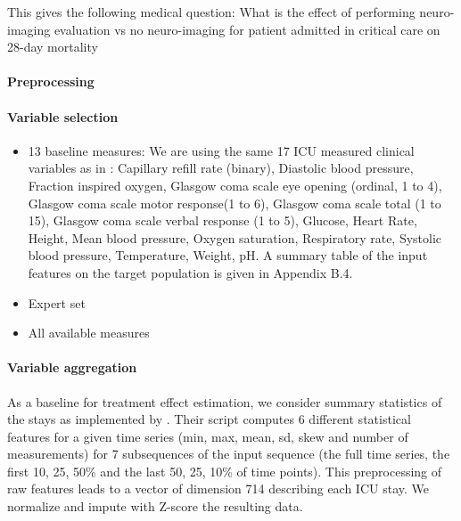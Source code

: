This gives the following medical question: What is the effect of
\textcolor{I}{performing neuro-imaging evaluation} vs \textcolor{C}{no
  neuro-imaging} for patient admitted in critical care on \textcolor{O}{28-day mortality}

\paragraph{Preprocessing}

\paragraph{Variable selection}

\begin{itemize}
  \item 13 baseline measures: We are using the same 17 ICU measured clinical variables as in
        \citep{harutyunyan2019multitask}: Capillary refill rate (binary), Diastolic blood
        pressure, Fraction inspired oxygen, Glasgow coma scale eye opening (ordinal, 1
        to 4), Glasgow coma scale motor response(1 to 6), Glasgow coma scale total (1 to
        15), Glasgow coma scale verbal response (1 to 5), Glucose, Heart Rate, Height,
        Mean blood pressure, Oxygen saturation, Respiratory rate, Systolic blood
        pressure, Temperature, Weight, pH. A summary table of the input features on the
        target population is given in Appendix B.4.
  \item Expert set
  \item All available measures 
\end{itemize}

\paragraph{Variable aggregation}

As a baseline for treatment effect estimation, we consider summary statistics of
the stays as implemented by \citep{harutyunyan2019multitask}. Their script computes 6
different statistical features for a given time series (min, max, mean, sd, skew
and number of measurements) for 7 subsequences of the input sequence (the full
time series, the first 10, 25, 50\% and the last 50, 25, 10\% of time points).
This preprocessing of raw features leads to a vector of dimension 714 describing
each ICU stay. We normalize and impute with Z-score the resulting data.

